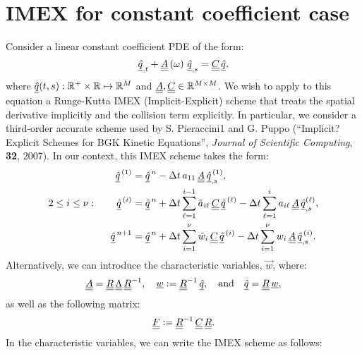 
\def\qr{\hat{q}}

\section{IMEX for constant coefficient case}
Consider a linear constant coefficient PDE of the form:
\begin{equation}
\vec{\qr}_{,t} + \mat{A}\left(\omega \right) \, \vec{\qr}_{,s} = \mat{C} \, \vec{\qr},
\end{equation}
where $\vec{\qr}(t,s): \reals^+ \times \reals \mapsto \reals^M$ and
${\underline{\underline{A}}}, {\underline{\underline{C}}} \in \mathbb R^{M \times M}$. We wish to apply to this equation a
Runge-Kutta IMEX (Implicit-Explicit) scheme that treats the spatial derivative implicitly and the collision term explicitly. In particular, we consider a third-order accurate scheme used by S. Pieraccini1 and G. Puppo (``Implicit?Explicit Schemes for BGK Kinetic Equations'', {\it Journal of Scientific Computing}, {\bf 32}, 2007). 
In our context, this IMEX scheme takes the form:
\begin{align}
        \vec{\qr}^{ \, (1)} &= \vec{\qr}^{ \, n} - {\Delta t} \, a_{11} \, \mat{A} \, \vec{\qr}^{ \, (1)}_{,s}, \\
       2 \le i \le \nu: \qquad \vec{\qr}^{ \, (i)} &= \vec{\qr}^{ \, n} + \Delta t \sum_{\ell = 1}^{i-1} \tilde{a}_{i\ell} \, \mat{C} \, \vec{\qr}^{ \, (\ell)} - {\Delta t} \sum_{\ell=1}^{i} a_{i\ell} \, \mat{A} \, \vec{\qr}^{(\ell)}_{,s}, \\
        \vec{\qr}^{ \, n+1} &= \vec{\qr}^{ \, n} + \Delta t \sum_{i=1}^{\nu} \tilde{w}_i \, \mat{C} \, \vec{\qr}^{ \, (i)} - {\Delta t} \sum_{i = 1}^{\nu} w_i \, \mat{A} \, \vec{\qr}^{ \, (i)}_{,s}.
\end{align}
Alternatively, we can introduce the characteristic variables, $\vec{w}$, where:
\begin{equation}
\mat{A} = \mat{R} \, \mat{\Lambda} \, \mat{R}^{-1}, \quad \vec{w} := \mat{R}^{-1} \, \vec{\qr},
\quad \text{and} \quad \vec{\qr} = \mat{R} \, \vec{w},
\end{equation}
as well as the following matrix:
\begin{equation}
 {\underline{\underline{F}}} := {\underline{\underline{R}}}^{-1} \, {\underline{\underline{C}}} \, {\underline{\underline{R}}}.
\end{equation}
In the characteristic variables, we can write the IMEX scheme as follows:
